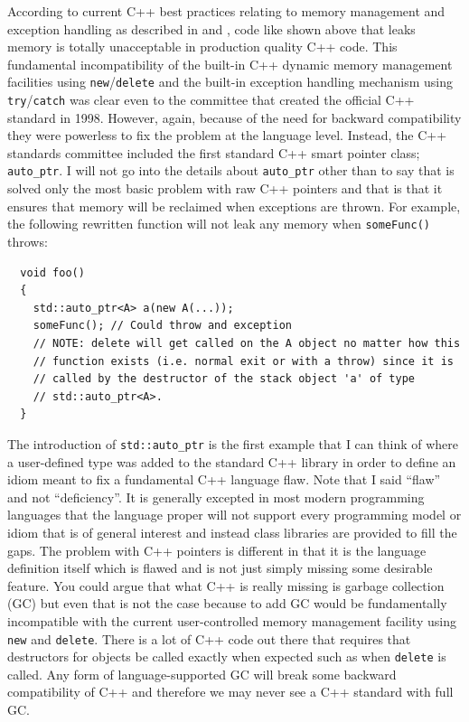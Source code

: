 \documentclass[pdf,ps2pdf,11pt]{SANDreport}
\begin{document}
According to current C++ best practices relating to memory management
and exception handling as described in {}\cite[Item
{}\#29]{EffectiveC++ThirdEdition} and {}\cite[Item
{}\#71]{C++CodingStandards05}, code like shown above that leaks memory
is totally unacceptable in production quality C++ code.  This
fundamental incompatibility of the built-in C++ dynamic memory
management facilities using {}\texttt{new}/\texttt{delete} and the
built-in exception handling mechanism using
{}\texttt{try}/\texttt{catch} was clear even to the committee that
created the official C++ standard in 1998.  However, again, because of
the need for backward compatibility they were powerless to fix the
problem at the language level.  Instead, the C++ standards committee
included the first standard C++ smart pointer class;
{}\texttt{auto\_ptr}.  I will not go into the details about
{}\texttt{auto\_ptr} other than to say that is solved only the most
basic problem with raw C++ pointers and that is that it ensures that
memory will be reclaimed when exceptions are thrown.  For example, the
following rewritten function will not leak any memory when
{}\texttt{someFunc()} throws:

{\small\begin{verbatim}
  void foo()
  {
    std::auto_ptr<A> a(new A(...));
    someFunc(); // Could throw and exception
    // NOTE: delete will get called on the A object no matter how this
    // function exists (i.e. normal exit or with a throw) since it is
    // called by the destructor of the stack object 'a' of type
    // std::auto_ptr<A>. 
  }
\end{verbatim}}

The introduction of {}\texttt{std::auto\_ptr} is the first example
that I can think of where a user-defined type was added to the
standard C++ library in order to define an idiom meant to fix a
fundamental C++ language flaw.  Note that I said ``flaw'' and not
``deficiency''.  It is generally excepted in most modern programming
languages that the language proper will not support every programming
model or idiom that is of general interest and instead class libraries
are provided to fill the gaps.  The problem with C++ pointers is
different in that it is the language definition itself which is flawed
and is not just simply missing some desirable feature.  You could
argue that what C++ is really missing is garbage collection (GC) but
even that is not the case because to add GC would be fundamentally
incompatible with the current user-controlled memory management
facility using {}\texttt{new} and {}\texttt{delete}.  There is a lot
of C++ code out there that requires that destructors for objects be
called exactly when expected such as when {}\texttt{delete} is called.
Any form of language-supported GC will break some backward
compatibility of C++ and therefore we may never see a C++ standard
with full GC.
\end{document}
